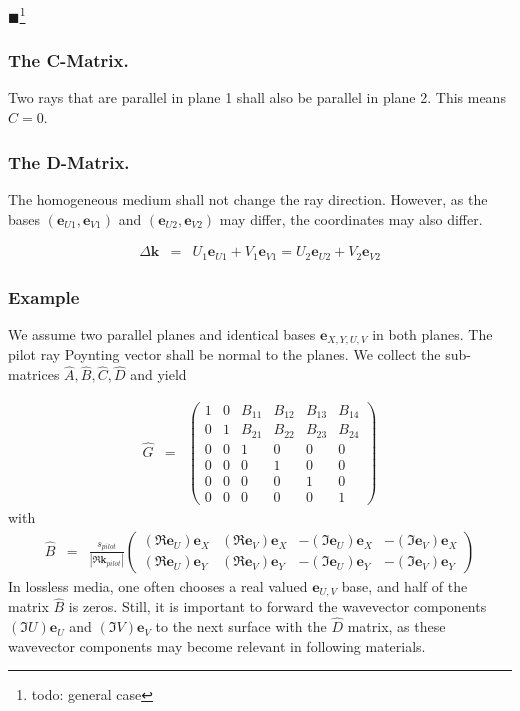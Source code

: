 \documentclass[12pt,a4paper,twoside,openright,BCOR10mm,headsepline,titlepage,abstracton,chapterprefix,final]{scrreprt}
\newcommand\Vector[1]{{\mathbf{#1}}}
\newcommand\wavenumber{k}
\newcommand\Wavevector{\Vector{\wavenumber}}
\newcommand{\remark}[1]{{\color{red}$\blacksquare$}\footnote{{\color{red}#1}}}
\begin{document}
\remark{todo: general case}

\subsubsection{The C-Matrix.} 
Two rays that are parallel in plane 1 shall also be parallel in plane 2.
This means $\hat{C} = 0$.

\subsubsection{The D-Matrix.}
The homogeneous medium shall not change the ray direction.
However, as the bases $( \Vector{e}_{U1}, \Vector{e}_{V1} )$ and $( \Vector{e}_{U2}, \Vector{e}_{V2} )$
may differ, the coordinates may also differ.

\begin{eqnarray}
 \Delta \Wavevector 
 &=& U_1 \Vector{e}_{U1} + V_1 \Vector{e}_{V1} 
  =  U_2 \Vector{e}_{U2} + V_2 \Vector{e}_{V2}
\end{eqnarray}

\subsubsection{Example}
We assume two parallel planes and identical bases $\Vector{e}_{X,Y,U,V}$ in both planes. 
The pilot ray Poynting vector shall be normal to the planes.
We collect the sub-matrices $\hat{A}, \hat{B}, \hat{C}, \hat{D}$ and yield

\begin{eqnarray}
 \hat{G} &=&
 \begin{pmatrix}
  1 & 0 & B_{11} & B_{12} & B_{13} & B_{14} \\
  0 & 1 & B_{21} & B_{22} & B_{23} & B_{24} \\
  0 & 0 & 1 & 0 & 0 & 0 \\
  0 & 0 & 0 & 1 & 0 & 0 \\
  0 & 0 & 0 & 0 & 1 & 0 \\
  0 & 0 & 0 & 0 & 0 & 1  
 \end{pmatrix}
 \label{eq:xyuv_propagation_homogeneous}
\end{eqnarray}
with\begin{eqnarray}
 \hat{B} &=&
 \frac{ s_{pilot} }{| \Re \Wavevector_{pilot} |}
 \begin{pmatrix}
  (\Re \Vector{e}_U) \Vector{e}_X & (\Re \Vector{e}_V) \Vector{e}_X & -(\Im \Vector{e}_U) \Vector{e}_X & -(\Im \Vector{e}_V) \Vector{e}_X \\
  (\Re \Vector{e}_U) \Vector{e}_Y & (\Re \Vector{e}_V) \Vector{e}_Y & -(\Im \Vector{e}_U) \Vector{e}_Y & -(\Im \Vector{e}_V) \Vector{e}_Y
 \end{pmatrix}
\end{eqnarray}
In lossless media, one often chooses a real valued $\Vector{e}_{U,V}$ base,
and half of the matrix $\hat{B}$ is zeros.
Still, it is important to forward the wavevector components 
$(\Im U) \Vector{e}_U$ and $(\Im V) \Vector{e}_V$
to the next surface with the $\hat{D}$ matrix, 
as these wavevector components may become relevant in following materials.
\end{document}
